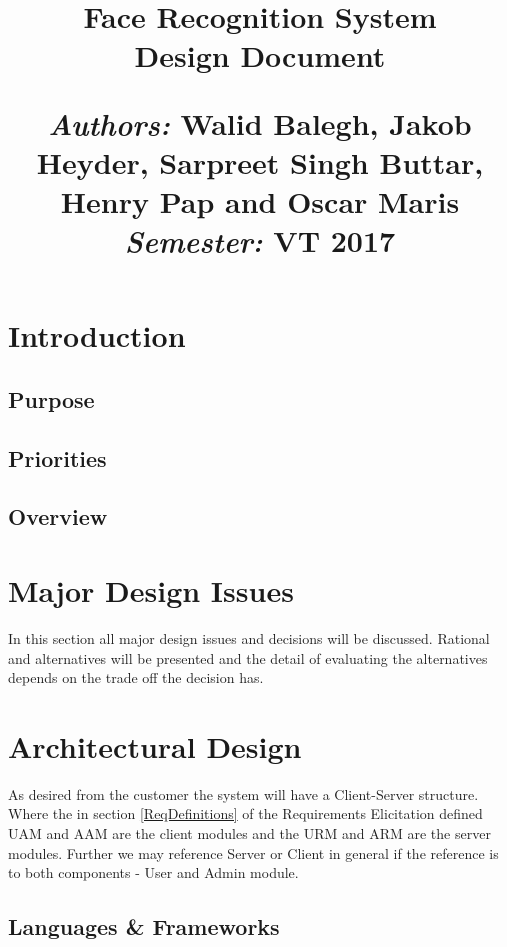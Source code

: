 \documentclass[a4paper,11pt]{article}
\title{
\vspace{-8cm}
\begin{flushleft}
    \vspace{10cm}
    \normalfont \normalsize
    \vspace{-1.3cm}
\end{flushleft}
\vspace{3cm}
\begin{flushleft}
    \huge Face Recognition System \\
    \LARGE  Design Document\\
\end{flushleft}
\null
\vfill
\begin{minipage}{\textwidth}
\begin{flushleft} \large
\emph{Authors:} Walid Balegh, Jakob Heyder, Sarpreet Singh Buttar, Henry \hspace{45pt} Pap and Oscar Maris \\ %
\emph{Semester:} VT 2017\\ %
\end{flushleft}
\end{minipage}
}
\date{}
\begin{document}
\maketitle

\newpage

\tableofcontents

\newpage


\section{Introduction}

\subsection{Purpose}

\subsection{Priorities}

\subsection{Overview}

\section{Major Design Issues}
In this section all major design issues and decisions will be discussed. Rational and alternatives will be presented and the detail of evaluating the alternatives depends on the trade off the decision has. 

\section{Architectural Design}
As desired from the customer the system will have a Client-Server structure. Where the in section \ref{ReqDefinitions} of the Requirements Elicitation defined UAM and AAM are the client modules and the URM and ARM are the server modules. Further we may reference Server or Client in general if  the reference is to both components - User and Admin module.

\subsection{Languages \& Frameworks}
\end{document}
